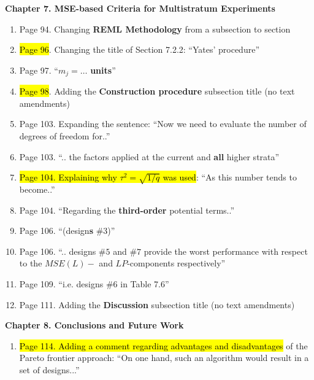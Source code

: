 \documentclass[11pt,a4paper,oneside]{article}
\begin{document}
\textbf{Chapter 7. MSE-based Criteria for Multistratum Experiments}
\begin{enumerate}
\item Page 94. Changing \textbf{REML Methodology} from a subsection to section
\item \hl{Page 96}. Changing the title of Section 7.2.2: ``Yates' procedure'' 
\item Page 97. ``$m_j=\ldots$ \textbf{units}''
\item \hl{Page 98}. Adding the \textbf{Construction procedure} subsection title (no text amendments)
\item Page 103. Expanding the sentence: ``Now we need to evaluate the number of degrees of freedom for..''
\item Page 103. ``.. the factors applied at the current and \textbf{all} higher strata''
\item \hl{Page 104. Explaining why $\tau^2=\sqrt{1/q}$ was used}: ``As this number tends to become..''
\item Page 104. ``Regarding the \textbf{third-order} potential terms..''
\item Page 106. ``(design\textbf{s} \#$3$)''
\item Page 106. ``.. designs \#$5$ and \#$7$ provide the worst performance with respect to the $MSE(L)-$ and $LP$-components respectively''
\item Page 109. ``i.e. designs \#$6$ in Table 7.6''
\item Page 111. Adding the \textbf{Discussion} subsection title (no text amendments)
\end{enumerate}

\textbf{Chapter 8. Conclusions and Future Work}
\begin{enumerate}
\item \hl{Page 114. Adding a comment regarding advantages and disadvantages} of the Pareto frontier approach: ``On one hand, such an algorithm would result in a set of designs...''
\end{enumerate}



\end{document}
